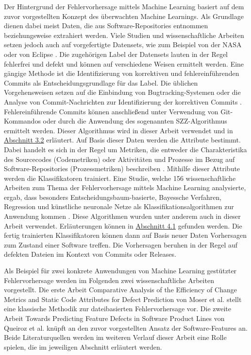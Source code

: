 Der Hintergrund der Fehlervorhersage mittels Machine Learning basiert auf dem zuvor vorgestellten Konzept des überwachten Machine Learnings. Als Grundlage dienen dabei meist Daten, die aus Software-Repositories entnommen beziehungsweise extrahiert werden. Viele Studien und wissenschaftliche Arbeiten setzen jedoch auch auf vorgefertigte Datensets, wie zum Beispiel von der NASA oder von Eclipse \cite{Son2019}. Die zugehörigen Label der Datensets lauten in der Regel \glqq fehlerfrei\grqq{} und \glqq defekt\grqq{} und können auf verschiedene Weisen ermittelt werden. Eine gängige Methode ist die Identifizierung von korrektiven und fehlereinführenden Commits als Entscheidungsgrundlage für das Label. Die üblichen Vorgehensweisen setzen auf die Einbindung von Bugtracking-Systemen oder die Analyse von Commit-Nachrichten zur Identifizierung der korrektiven Commits \cite{Queiroz2016,Zimmermann2007}. Fehlereinführende Commits können anschließend unter Verwendung von Git-Kommandos oder durch die Anwendung des sogenannten SZZ-Algorithmus ermittelt werden. Dieser Algorithmus wird in dieser Arbeit verwendet und in \hyperref[szz-def]{Abschnitt 3.2} erläutert. Auf Basis dieser Daten werden die Attribute bestimmt. Dabei handelt es sich in der Regel um Metriken, die entweder die Charakteristika des Sourcecodes (Codemetriken) oder Aktivitäten und Prozesse im Bezug auf Software-Repositories (Prozessmetriken) beschreiben \cite{Son2019,Rahman2013}. Mithilfe dieser Attribute werden die Klassifikatoren trainiert. Eine Studie, welche 156 wissenschaftliche Arbeiten zum Thema der Fehlervorhersage mittels Machine Learning analysierte, ergab, dass besonders Entscheidungsbaum-basierte, Bayessche Verfahren, Regression und künstliche neuronale Netze als Klassifikationsalgorithmen zur Anwendung kommen \cite{Son2019}. Diese Algorithmen wurden unter anderem auch in dieser Arbeit verwendet. Erläuterungen können in \hyperref[algorithms]{Abschnitt 4.1} gefunden werden. Die fertig trainierten Klassifikatoren können dann auf Basis neuer Daten Vorhersagen zum Zustand einer Software treffen. Die Vorhersagen beruhen in der Regel auf defekten Dateien im Kontext von Commits oder Releases.

Als Beispiel für zwei konkrete Anwendungen von Machine Learning gestützter Fehlervorhersage werden im Folgenden zwei wissenschaftliche Arbeiten vorgestellt. Die erste Arbeit \glqq Comparative Analysis of the Efficiency of Change Metrics and Static Code Attributes for Defect Prediction\grqq{} von Moser et al. \cite{Moser2008} stellt eine klassische Methodik zur dateibasierten Fehlervorhersage vor. Die zweite Arbeit \glqq Towards Predicting Feature Defects in Software Product Lines\grqq{} von Queiroz et al. \cite{Queiroz2016} knüpft an den zuvor vorgestellten Ansatz der Software-Features an. Beide Literaturquellen werden im weiteren Verlauf dieser Arbeit eine Rolle spielen, die im jeweiligen Abschnitt erläutert werden.

